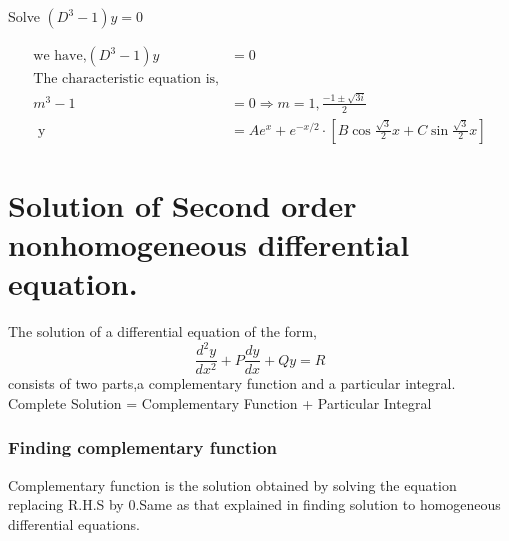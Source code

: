 \begin{exercise}
	Solve $\left(D^{3}-1\right) y=0$
\end{exercise}
\begin{answer}
	\begin{align*}
	\text{we have,}\left(D^{3}-1\right) y&=0\\
	\text{The characteristic equation is,}\\
	m^{3}-1&=0 \Rightarrow m=1, \frac{-1 \pm \sqrt{3 i}}{2}\\\text { y }&=A e^{x}+e^{-x / 2} \cdot\left[B \cos \frac{\sqrt{3}}{2} x+C \sin \frac{\sqrt{3}}{2} x\right]
	\end{align*}
\end{answer}
\section{Solution of Second order nonhomogeneous differential equation.}
The solution of a differential equation of the form,$$\frac{d^{2} y}{d x^{2}}+P \frac{d y}{d x}+Q y=R$$ consists of two parts,a complementary function and a particular integral.
\\Complete Solution = Complementary Function + Particular Integral
\begin{center}
\end{center}
\subsubsection{Finding complementary function}
Complementary function is the solution obtained by solving the equation replacing R.H.S by 0.Same as that explained in finding solution to homogeneous differential equations.
